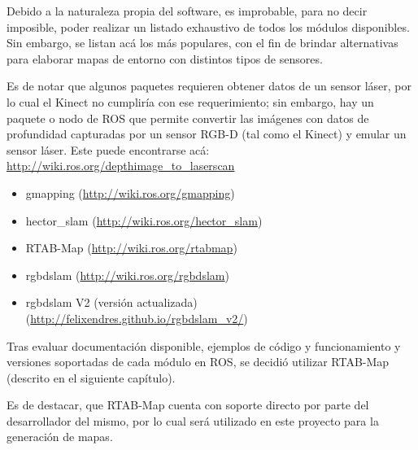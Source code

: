 Debido a la naturaleza propia del software, es improbable, para no decir imposible, poder realizar un listado exhaustivo de todos los módulos disponibles. Sin embargo, se listan acá los más populares, con el fin de brindar alternativas para elaborar mapas de entorno con distintos tipos de sensores.

Es de notar que algunos paquetes requieren obtener datos de un sensor láser, por lo cual el Kinect no cumpliría con ese requerimiento; sin embargo, hay un paquete o nodo de ROS que permite convertir las imágenes con datos de profundidad capturadas por un sensor RGB-D (tal como el Kinect) y emular un sensor láser. Este puede encontrarse acá: \url{http://wiki.ros.org/depthimage_to_laserscan}

\begin{itemize}
	\itemsep1pt \parskip1pt 
	\item gmapping (\url{http://wiki.ros.org/gmapping})
	\item hector\_slam (\url{http://wiki.ros.org/hector_slam})
	\item RTAB-Map (\url{http://wiki.ros.org/rtabmap})
	\item rgbdslam (\url{http://wiki.ros.org/rgbdslam})
	\item rgbdslam V2 (versión actualizada) (\url{http://felixendres.github.io/rgbdslam_v2/})
\end{itemize}

Tras evaluar documentación disponible, ejemplos de código y funcionamiento y versiones soportadas de cada módulo en ROS, se decidió utilizar RTAB-Map (descrito en el siguiente capítulo).

Es de destacar, que RTAB-Map cuenta con soporte directo por parte del desarrollador del mismo, por lo cual será utilizado en este proyecto para la generación de mapas.
